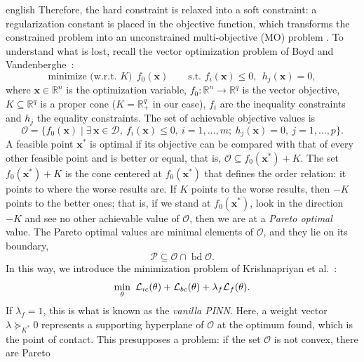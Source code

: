 \documentclass[0000.tex]{subfiles}
\begin{document}
\begin{hyphenrules}{english}
Therefore, the hard constraint is relaxed into a soft constraint: a regularization constant is placed in
the objective function, which transforms the constrained problem into an unconstrained multi-objective
(MO) problem \cite{krishnapriyan2021}. To understand what is lost, recall the vector optimization
problem of Boyd and Vandenberghe~\cite{boyd2004}:
\begin{equation}
  \text{minimize (w.r.t. } K)\ \ f_0(\mathbf{x})\qquad\text{s.t. } f_i(\mathbf{x})\le0,\ \ h_j(\mathbf{x})=0,
  \label{eq:vector-opt}
\end{equation}
where $\mathbf{x}\in\mathbb{R}^n$ is the optimization variable, $f_0:\mathbb{R}^n\to\mathbb{R}^q$ is the vector objective,
$K\subseteq\mathbb{R}^q$ is a proper cone ($K=\mathbb{R}^q_+$ in our case), $f_i$ are the inequality constraints and
$h_j$ the equality constraints. The set of achievable objective values is
\begin{equation}
  \mathcal{O}=\{f_0(\mathbf{x})\mid\exists\,\mathbf{x}\in\mathcal{D},\ f_i(\mathbf{x})\le0,\ i=1,\dots,m;\ h_j(\mathbf{x})=0,\ j=1,\dots,p\}.
  \label{eq:achievable-set}
\end{equation}
A feasible point $\mathbf{x}^{*}$ is optimal if its objective can be compared with that of every other feasible
point and is better or equal, that is, $\mathcal{O}\subseteq f_0(\mathbf{x}^{*})+K$. The set $f_0(\mathbf{x}^{*})+K$ is
the cone centered at $f_0(\mathbf{x}^{*})$ that defines the order relation: it points to where the worse results
are. If $K$ points to the worse results, then $-K$ points to the better ones; that is, if we stand at
$f_0(\mathbf{x}^{*})$, look in the direction $-K$ and see no other achievable value of $\mathcal{O}$, then we are at
a \emph{Pareto optimal} value. The Pareto optimal values are minimal elements of $\mathcal{O}$, and they
lie on its boundary,
\begin{equation}
  \mathcal{P}\subseteq\mathcal{O}\cap\operatorname{bd}\mathcal{O}.
  \label{eq:pareto}
\end{equation}
In this way, we introduce the minimization problem of Krishnapriyan et al.~\cite{krishnapriyan2021}:
\begin{equation}
  \min_{\theta}\ \Loss_{ic}(\theta)+\Loss_{bc}(\theta)+\lambda_f\Loss_f(\theta).
  \label{eq:soft}
\end{equation}
If $\lambda_f=1$, this is what is known as the \emph{vanilla PINN}. Here, a weight vector
$\lambda\succeq_{K^{*}}0$ represents a supporting hyperplane of $\mathcal{O}$ at the optimum found, which is
the point of contact. This presupposes a problem: if the set $\mathcal{O}$ is not convex, there are Pareto

\end{hyphenrules}
\end{document}
